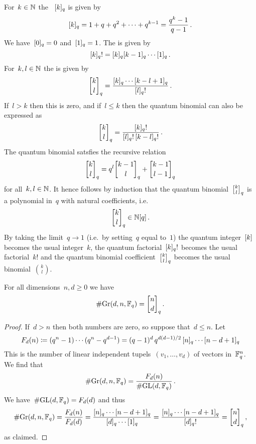 \documentclass[a4paper,11pt]{scrartcl}
\begin{document}
\begin{recall}
  For~$k \in \mathbb{N}$ the ~$[k]_q$ is given by
  \[
    [k]_q
    =
    1 + q + q^2 + \dotsb + q^{k-1}
    =
    \frac{q^k - 1}{q - 1} \,.
  \]
  We have~$[0]_q = 0$ and~$[1]_q = 1$.
  The  is given by
  \[
    [k]_q !
    =
    [k]_q [k-1]_q \dotsm [1]_q \,.
  \]
  For~$k, l \in \mathbb{N}$ the  is given by
  \[
    \qbinom{k}{l}_q
    =
    \frac{\qnum{k}_q \dotsm \qnum{k-l+1}_q}{\qnum{l}_q!} \,.
  \]
  If~$l > k$ then this is zero, and if~$l \leq k$ then the quantum binomial can also be expressed as
  \[
    \qbinom{k}{l}_q
    =
    \frac{\qnum{k}_q!}{\qnum{l}_q! \, \qnum{k-l}_q!} \,.
  \]
  The quantum binomial satsfies the recursive relation
  \[
    \qbinom{k}{l}_q
    =
    q^l \qbinom{k-1}{l}_q
    +
    \qbinom{k-1}{l-1}_q
  \]
  for all~$k, l \in \mathbb{N}$.
  It hence follows by induction that the quantum binomial~$\qbinom{k}{l}_q$ is a polynomial in~$q$ with natural coefficients, i.e.
  \[
    \qbinom{k}{l}_q
    \in
    \Natural[q] \,.
  \]
  By taking the limit~$q \to 1$ (i.e.\ by setting~$q$ equal to~$1$) the quantum integer~$[k]$ becomes the usual integer~$k$, the quantum factorial~$[k]_q!$ becomes the usual factorial~$k!$ and the quantum binomial coefficient~$\qbinom{k}{l}_q$ becomes the usual binomial~$\binom{k}{l}$.
\end{recall}

\begin{lemma}
  \label{size of quantum grassmannian}
  For all dimensions~$n, d \geq 0$ we have
  \[
    \counting {\Gr(d, n, \Finite_q)}
    =
    \qbinom{n}{d}_q \,.
  \]
\end{lemma}

\begin{proof}
  If~$d > n$ then both numbers are zero, so suppose that~$d \leq n$.  
  Let
  \[
    F_d(n)
    \coloneqq
    (q^n - 1) \dotsm (q^n - q^{d-1})
    =
    (q-1)^d \, q^{d(d-1)/2} \, [n]_q \dotsm [n-d+1]_q
  \]
  This is the number of linear independent tupels~$(v_1, \dotsc, v_d)$ of vectors in~$\mathbb{F}_q^n$.
  We find that
  \[
    \# {\operatorname{Gr}(d, n, \mathbb{F}_q)}
    =
    \frac{ F_d(n) }{ \# {\operatorname{GL}(d, \mathbb{F}_q)} } \,.
  \]
  We have~$\# {\operatorname{GL}(d, \mathbb{F}_q)} = F_d(d)$ and thus
  \[
    \counting {\Gr(d, n, \Finite_q)}
    =
    \frac{ F_d(n) }{ F_d(d) }
    =
    \frac{ \qnum{n}_q \dotsm \qnum{n-d+1}_q }{ \qnum{d}_q \dotsm  \qnum{1}_q }
    =
    \frac{ \qnum{n}_q \dotsm \qnum{n-d+1}_q }{ \qnum{d}_q! }
    =
    \qbinom{n}{d}_q \,,
  \]
  as claimed.
\end{proof}
\end{document}
